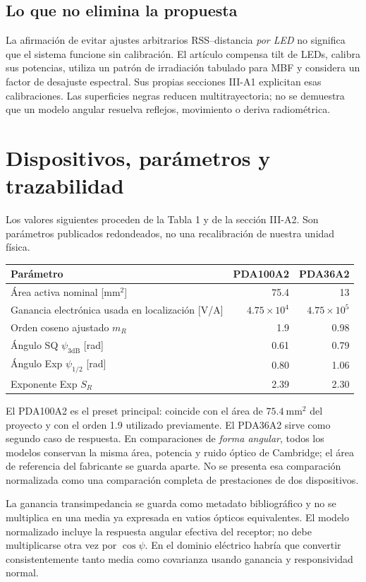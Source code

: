 \documentclass[11pt,a4paper]{article}
\begin{document}
\subsection{Lo que no elimina la propuesta}
La afirmación de evitar ajustes arbitrarios RSS--distancia \emph{por LED} no significa que el sistema funcione sin calibración. El artículo compensa tilt de LEDs, calibra sus potencias, utiliza un patrón de irradiación tabulado para MBF y considera un factor de desajuste espectral. Sus propias secciones III-A1 explicitan esas calibraciones. Las superficies negras reducen multitrayectoria; no se demuestra que un modelo angular resuelva reflejos, movimiento o deriva radiométrica.

\section{Dispositivos, parámetros y trazabilidad}
Los valores siguientes proceden de la Tabla 1 y de la sección III-A2. Son parámetros publicados redondeados, no una recalibración de nuestra unidad física.
\begin{center}
\begin{tabular}{lrr}
\toprule Parámetro & PDA100A2 & PDA36A2 \\
\midrule
Área activa nominal [mm$^2$] & 75.4 & 13 \\
Ganancia electrónica usada en localización [V/A] & $4.75\times10^4$ & $4.75\times10^5$ \\
Orden coseno ajustado $m_R$ & 1.9 & 0.98 \\
Ángulo SQ $\psi_{3\mathrm{dB}}$ [rad] & 0.61 & 0.79 \\
Ángulo Exp $\psi_{1/2}$ [rad] & 0.80 & 1.06 \\
Exponente Exp $S_R$ & 2.39 & 2.30 \\
\bottomrule
\end{tabular}
\end{center}
El PDA100A2 es el preset principal: coincide con el área de $75.4\ \mathrm{mm}^2$ del proyecto y con el orden 1.9 utilizado previamente. El PDA36A2 sirve como segundo caso de respuesta. En comparaciones de \emph{forma angular}, todos los modelos conservan la misma área, potencia y ruido óptico de Cambridge; el área de referencia del fabricante se guarda aparte. No se presenta esa comparación normalizada como una comparación completa de prestaciones de dos dispositivos.

La ganancia transimpedancia se guarda como metadato bibliográfico y no se multiplica en una media ya expresada en vatios ópticos equivalentes. El modelo normalizado incluye la respuesta angular efectiva del receptor; no debe multiplicarse otra vez por $\cos\psi$. En el dominio eléctrico habría que convertir consistentemente tanto media como covarianza usando ganancia y responsividad normal.
\end{document}
